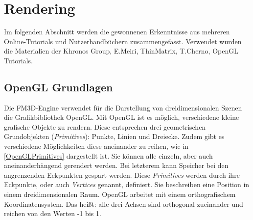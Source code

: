 \section[Rendering]{Rendering}
\label{rendering}

Im folgenden Abschnitt werden die gewonnenen Erkenntnisse aus mehreren Online-Tutorials und Nutzerhandbüchern zusammengefasst. Verwendet wurden die Materialien der Khronos Group, E.Meiri, ThinMatrix, T.Cherno, OpenGL Tutorials.\cite{GLReference, OglDev, ThinMatrix, SparkyEngine, GLTut}


\subsection{OpenGL Grundlagen}

Die FM3D-Engine verwendet für die Darstellung von dreidimensionalen Szenen die Grafikbibliothek OpenGL. Mit OpenGL ist es möglich, verschiedene kleine grafische Objekte zu rendern. Diese entsprechen drei geometrischen Grundobjekten (\textit{Primitives}): 
Punkte, Linien und Dreiecke. Zudem gibt es verschiedene Möglichkeiten diese aneinander zu reihen, wie in \cref{OpenGLPrimitives} dargestellt ist. Sie können alle einzeln, aber auch aneinanderhängend gerendert werden. Bei letzterem kann Speicher bei den angrenzenden Eckpunkten gespart werden. Diese \textit{Primitives} werden durch ihre Eckpunkte, oder auch \textit{Vertices} genannt, definiert. 
Sie beschreiben eine Position in einem dreidimensionalen Raum. OpenGL arbeitet mit einem orthografischem Koordinatensystem. Das heißt: alle drei Achsen sind orthogonal zueinander und reichen von den Werten -1 bis 1.

